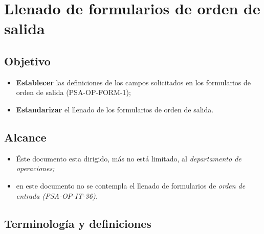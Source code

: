 \renewcommand{\MayorVer}{1}
\renewcommand{\MenorVer}{0}
\renewcommand{\Codigo}{BPD-11-IT}
\renewcommand{\FechaPub}{2023--01}
\renewcommand{\Titulo}{Llenado de formularios de orden de salida}
\section{\Titulo}

\subsection{Objetivo}

\begin{itemize}
	\item \textbf{Establecer} las definiciones de los campos solicitados en los formularios de orden de salida (PSA-OP-FORM-1);
	\item \textbf{Estandarizar} el llenado de los formularios de orden de salida.
\end{itemize}

\subsection{Alcance}

\begin{itemize}
	\item Éste documento esta dirigido, más no está limitado, al \emph{departamento de operaciones;}
	\item en este documento no se contempla el llenado de formularios de \emph{orden de entrada (PSA-OP-IT-36).}
\end{itemize}

\subsection{Terminología y definiciones}


